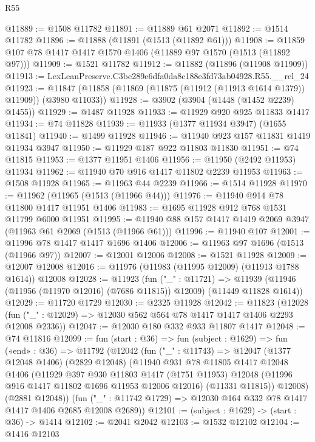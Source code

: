\begin{lexlean}{R55}
\begin{coremodule}
{{@11889 := @1508 @11782
@11891 := @11889 @61 @2071
@11892 := @1514 @11782
@11896 := @11888 (@11891 (@1513 (@11892 @61)))
@11908 := @11859 @107 @78 @1417 @1417 @1570 @1406 (@11889 @97 @1570 (@1513 (@11892 @97)))
@11909 := @1521 @11782
@11912 := @11882 (@11896 (@11908 @11909))
@11913 := LexLeanPreserve.C3be289e6dfa0da8c188e3fd73ab04928.R55.__rel_24
@11923 := @11847 (@11858 (@11869 (@11875 (@11912 (@11913 @1614 @1379)) @11909)) (@3980 @11033))
@11928 := @3902 (@3904 (@1448 (@1452 @2239) @1455))
@11929 := @1487 @11928
@11933 := @11929 @920 @925 @11833 @1417
@11934 := @74 @11828
@11939 := @11933 (@1377 @11934 @3947) (@1655 @11841)
@11940 := @1499 @11928
@11946 := @11940 @923 @157 @11831 @1419 @11934 @3947
@11950 := @11929 @187 @922 @11803 @11830
@11951 := @74 @11815
@11953 := @1377 @11951 @1406
@11956 := @11950 (@2492 @11953) @11934
@11962 := @11940 @70 @916 @1417 @11802 @2239 @11953
@11963 := @1508 @11928
@11965 := @11963 @44 @2239
@11966 := @1514 @11928
@11970 := @11962 (@11965 (@1513 (@11966 @44)))
@11976 := @11940 @914 @78 @11800 @1417 @11951 @1406
@11983 := @1695 @11928 @912 @768 @1531 @11799 @6000 @11951
@11995 := @11940 @88 @157 @1417 @1419 @2069 @3947 (@11963 @61 @2069 (@1513 (@11966 @61)))
@11996 := @11940 @107
@12001 := @11996 @78 @1417 @1417 @1696 @1406
@12006 := @11963 @97 @1696 (@1513 (@11966 @97))
@12007 := @12001 @12006
@12008 := @1521 @11928
@12009 := @12007 @12008
@12016 := @11976 (@11983 (@11995 @12009) (@11913 @1788 @1614)) @12008
@12028 := @11923
    (fun ("_" : @11721) =>
    @11939 (@11946 (@11956 (@11970 @12016) (@7686 @11815)) @12009) (@11449 @11828 @1614))
@12029 := @11720 @1729
@12030 := @2325 @11928
@12042 := @11823
    (@12028 (fun ("_" : @12029) => @12030 @562 @564 @78 @1417 @1417 @1406 @2293 @12008 @2336))
@12047 := @12030 @180 @332 @933 @11807 @1417
@12048 := @74 @11816
@12099 := fun (start : @36) =>
  fun (subject : @1629) =>
  fun («end» : @36) =>
  @11792
    (@12042
      (fun ("_" : @11743) =>
      @12047
        (@1377 @12048 @1406)
        (@2829 @12048)
        (@11940
          @931
          @78
          @11805
          @1417
          @12048
          @1406
          (@11929
            @397
            @930
            @11803
            @1417
            (@1751 @11953)
            @12048
            (@11996 @916 @1417 @11802 @1696 @11953 @12006 @12016)
            (@11331 @11815))
          @12008)
        (@2881 @12048))
      (fun ("_" : @11742 @1729) => @12030 @164 @332 @78 @1417 @1417 @1406 @2685 @12008 @2689))
@12101 := (subject : @1629) -> (start : @36) -> @1414
@12102 := @2041 @2042
@12103 := @1532 @12102
@12104 := @1416 @12103
}}
\end{coremodule}
\end{lexlean}
